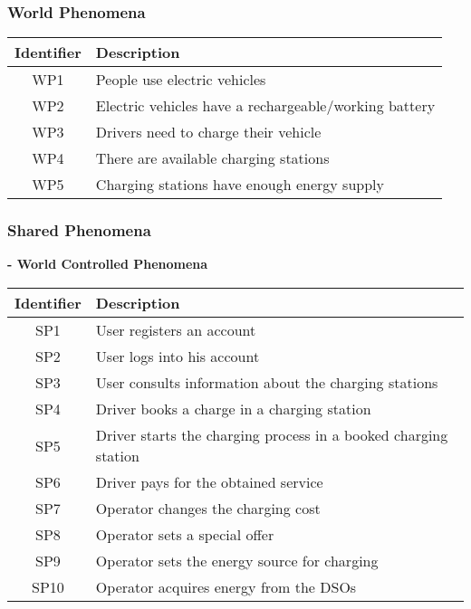 \documentclass[../main.tex]{subfiles}
\begin{document}
\subsubsection{World Phenomena}
\begin{center}
\begin{longtable}{| c | l |} 
 \hline
 \textbf{Identifier} & \textbf{Description} \\
 \hline
 WP1 & People use electric vehicles\\ 
 \hline
 WP2 & Electric vehicles have a rechargeable/working battery \\
 \hline
 WP3 & Drivers need to charge their vehicle\\ 
 \hline
 WP4 & There are available charging stations \\
 \hline
 WP5 & Charging stations have enough energy supply \\
 \hline

\end{longtable}
\end{center}

\vspace{-3em}
\subsubsection{Shared Phenomena}
\hspace{1em}\textbf{- World Controlled Phenomena}
\vspace{-1em}
\begin{center}
\begin{longtable}{| c | l |} 
 \hline
 \textbf{Identifier} & \textbf{Description} \\
 \hline
 SP1 & User registers an account \\ 
 \hline
 SP2 & User logs into his account \\
 \hline
 SP3 & User consults information about the charging stations \\
 \hline
 SP4 & Driver books a charge in a charging station \\
 \hline
 SP5 & Driver starts the charging process in a booked charging station \\
 \hline
 SP6 & Driver pays for the obtained service \\
 \hline
 SP7 & Operator changes the charging cost \\
 \hline
 SP8 & Operator sets a special offer \\
 \hline
 SP9 & Operator sets the energy source for charging \\
 \hline
 SP10 & Operator acquires energy from the DSOs \\
 \hline
\end{longtable}
\end{center}
\end{document}
